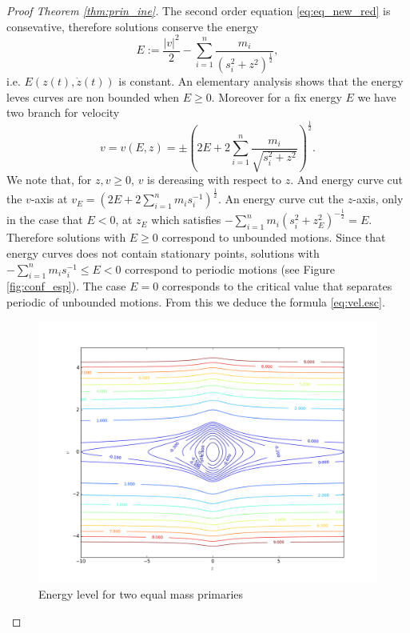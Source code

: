 \documentclass[twoside]{article}
\theoremstyle{remark}
\begin{document}
\begin{proof}[Proof Theorem \ref{thm:prin_ine}]
The second order equation \eqref{eq:eq_new_red} is consevative, therefore solutions conserve the energy
\begin{equation}\label{eq:conser.energ}
E:=\frac{|v|^2}{2}-\sum_{i=1}^{n} \frac{m_i}{\left(s_i^2+z^2\right)^{\frac12}},
\end{equation}
i.e. $E(z(t),\dot{z}(t))$ is constant. An elementary analysis shows that the energy leves curves are non bounded when $E\geq 0$. Moreover for a fix energy $E$ we have two branch for velocity
\[v=v(E,z)=\pm \left(2E+2\sum_{i=1}^n\frac{m_i}{\sqrt{s_i^2+z^2}}\right)^{\frac12}.\]
We note that,  for $z,v\geq 0$, $v$ is dereasing with respect to $z$. And energy curve cut the $v$-axis at $v_{E}=(2E+2\sum_{i=1}^n m_is_i^{-1})^{\frac12}$. An energy curve cut the $z$-axis, only in the case that $E<0$, at $z_{E}$ which satisfies $-\sum_{i=1}^n m_i (s_i^2+z_{E}^2)^{-\frac12}=E$. Therefore solutions with $E\geq 0$ correspond to unbounded motions.  Since that energy curves does not contain stationary points, solutions with $-\sum_{i=1}^n m_is_i^{-1}\leq E<0$ correspond to periodic motions (see Figure \ref{fig:conf_esp}). The case $E=0$ corresponds to the critical value that separates periodic of unbounded motions. From this we deduce the formula \eqref{eq:vel.esc}.

\begin{figure}[h]
\begin{center}
\includegraphics[scale=0.3]{figure_1.png}
\caption{Energy level for two equal mass primaries}\label{fig:energy}
\end{center}
\end{figure}


\end{proof}
\end{document}
